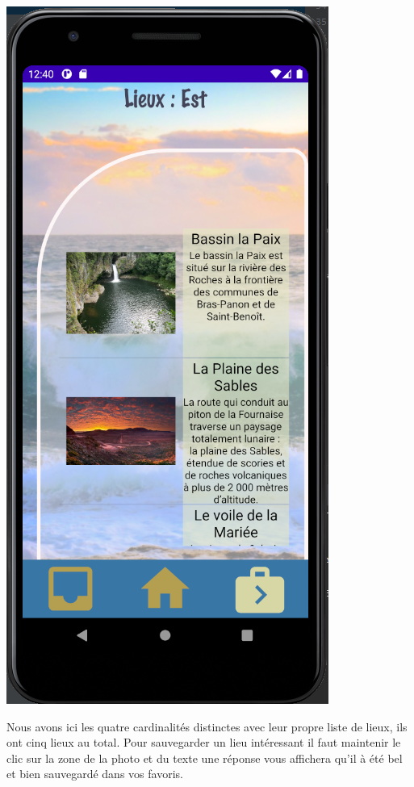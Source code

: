 \documentclass{article}
\begin{document}
\hfill
\begin{minipage}{0.23\textwidth}
\includegraphics[width=\textwidth]{Lieux_est}
\end{minipage}
Nous avons ici les quatre cardinalités distinctes avec leur propre liste de lieux, ils ont cinq lieux au total. Pour sauvegarder un lieu intéressant il faut maintenir le clic sur la zone de la photo et du texte une réponse vous affichera qu'il à été bel et bien sauvegardé dans vos favoris.
\end{document}
